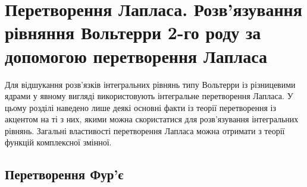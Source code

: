 \documentclass[14pt,twoside]{extreport}
\theoremstyle{mystyle}
\numberwithin{equation}{chapter}
\begin{document}

\chapter{Перетворення Лапласа. Розв'язування рівняння Вольтерри 2-го роду за допомогою перетворення Лапласа}\label{laplacetr}

Для відшукання розв'язків інтегральних рівнянь типу Вольтерри із різницевими ядрами у явному вигляді використовують інтегральне перетворення Лапласа. У цьому розділі наведено лише деякі основні факти із теорії перетворення із акцентом на ті з них, якими можна скористатися для розв'язування інтегральних рівнянь. Загальні властивості перетворення Лапласа можна отримати з теорії функцій комплексної змінної.

\section{Перетворення Фур'є}
\end{document}
